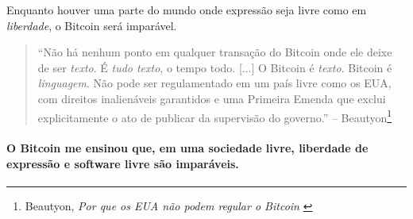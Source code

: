 Enquanto houver uma parte do mundo onde expressão seja livre como em \textit{liberdade}, o Bitcoin será imparável.

\begin{quotation}\begin{samepage}
\begin{flushright}
\enquote{Não há nenhum ponto em qualquer transação do Bitcoin onde ele deixe de ser \textit{texto}. É \textit{tudo texto}, o tempo todo. [...] O Bitcoin é \textit{texto}. Bitcoin é \textit{linguagem}. Não pode ser regulamentado em um país livre como os EUA, com direitos inalienáveis garantidos e uma Primeira Emenda que exclui explicitamente o ato de publicar da supervisão do governo.}
-- Beautyon\footnote{Beautyon, \textit{Por que os EUA não podem regular o Bitcoin} \cite{america-regulate-bitcoin}}
\end{flushright}\end{samepage}\end{quotation}

\paragraph{O Bitcoin me ensinou que, em uma sociedade livre, liberdade de expressão e software livre são imparáveis.}

%
%
%
%
%
%
%
